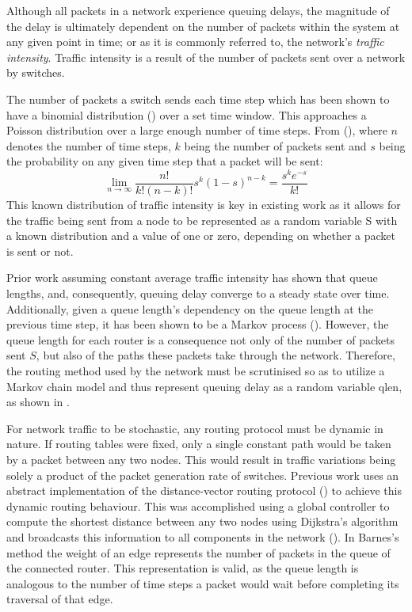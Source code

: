 Although all packets in a network experience queuing delays, the magnitude of the delay is ultimately dependent on the number of packets within the system at any given point in time; or as it is commonly referred to, the network's \textit{traffic intensity}. Traffic intensity is a result of the number of packets sent over a network by switches.\par
The number of packets a switch sends each time step which has been shown to have a binomial distribution (\cite{barnes_stochastic_2020}) over a set time window. This approaches a Poisson distribution over a large enough number of time steps. From (\cite{barnes_stochastic_2020}), where $n$ denotes the number of time steps, $k$ being the number of packets sent and $s$ being the probability on any given time step that a packet will be sent:
\[\lim_{n\to\infty} \frac{n!}{k!(n-k)!}s^k (1-s)^{n-k} =\frac{s^k e^{-s}}{k!}\]
This known distribution of traffic intensity is key in existing work as it allows for the traffic being sent from a node to be represented as a random variable S with a known distribution and a value of one or zero, depending on whether a packet is sent or not.\par
Prior work assuming constant average traffic intensity has shown that queue lengths, and, consequently, queuing delay converge to a steady state over time. Additionally, given a queue length's dependency on the queue length at the previous time step, it has been shown to be a Markov process (\cite{barnes_stochastic_2020}). However, the queue length for each router is a consequence not only of the number of packets sent $S$, but also of the paths these packets take through the network. Therefore, the routing method used by the network must be scrutinised so as to utilize a Markov chain model and thus represent queuing delay as a random variable \gls{qlen}, as shown in \cite{barnes_stochastic_2020}.\par
For network traffic to be stochastic, any routing protocol must be dynamic in nature. If routing tables were fixed, only a single constant path would be taken by a packet between any two nodes. This would result in traffic variations being solely a product of the packet generation rate of switches. Previous work uses an abstract implementation of the distance-vector routing protocol (\cite{perkins_ad_2003}) to achieve this dynamic routing behaviour. This was accomplished using a global controller to compute the shortest distance between any two nodes using Dijkstra's algorithm and broadcasts this information to all components in the network (\cite{barnes_stochastic_2020}). In Barnes's method the weight of an edge represents the number of packets in the queue of the connected router. This representation is valid, as the queue length is analogous to the number of time steps a packet would wait before completing its traversal of that edge.\par
